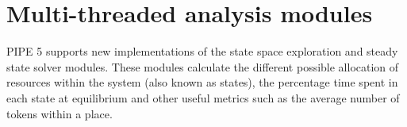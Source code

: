 \section{Multi-threaded analysis modules}
PIPE 5 supports new implementations of the state space exploration and steady state solver modules. These modules calculate the different possible allocation of resources within the system (also known as states), the percentage time spent in each state at equilibrium and other useful metrics such as the average number of tokens within a place. 


